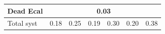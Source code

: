 \documentclass[compress, serif]{beamer}
\begin{document}
{\begin{table}[h!]
\begin{tabular}{ lcccccc }
    Dead Ecal & \multicolumn{6}{c}{0.03}                                                                       \\ %
    \hline                                                                                                         %
    Total syst & 0.18   & 0.25                & 0.19   & 0.30                    & 0.20 & 0.38                    \\ %
    \hline
    \hline
  \end{tabular}
\end{table}
}
\end{document}
